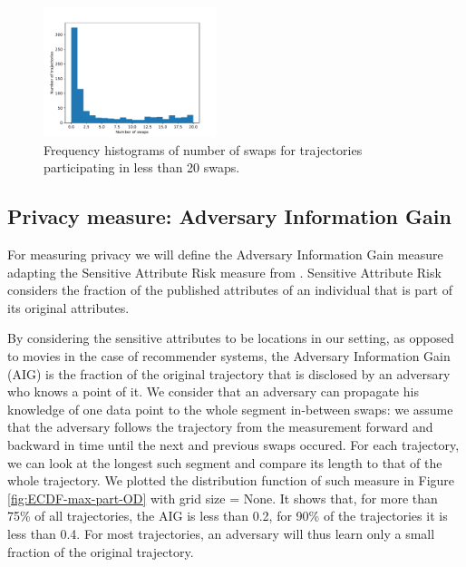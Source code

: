 \documentclass[times,twocolumn,final,authoryear]{elsarticle}
\begin{document}
\begin{figure}
    \includegraphics[width=0.45\textwidth]{figures/swaps-distribution-20.pdf}
  \caption{Frequency histograms of number of swaps for trajectories participating in less than 20 swaps.}
  \label{fig:swaps-distribution}%
\end{figure}

\subsection{Privacy measure: Adversary Information Gain}\label{Sec:InfoGain}
 
For measuring privacy we will define the Adversary Information Gain measure adapting the Sensitive Attribute Risk measure from \cite{Salas:2019}. Sensitive Attribute Risk considers the fraction of the published attributes of an individual that is part of its original attributes. 

By considering the sensitive attributes to be locations in our setting, as opposed to movies in the case of recommender systems, the Adversary Information Gain (AIG) is the fraction of the original trajectory that is disclosed by an adversary who knows a point of it.
We consider that an adversary can propagate his knowledge of one data point to the whole segment in-between swaps: we assume that the adversary follows the trajectory from the measurement forward and backward in time until the next and previous swaps occured. 
For each trajectory, we can look at the longest such segment and compare its length to that of the
whole trajectory. 
We plotted the distribution function of such measure in Figure \ref{fig:ECDF-max-part-OD} with grid size = None. It shows that, for more than 75\% of all
trajectories, the AIG is less than 0.2, for 90\% of the trajectories it is less
than 0.4. For most trajectories, an adversary will thus learn only a
small fraction of the original trajectory.
\end{document}
